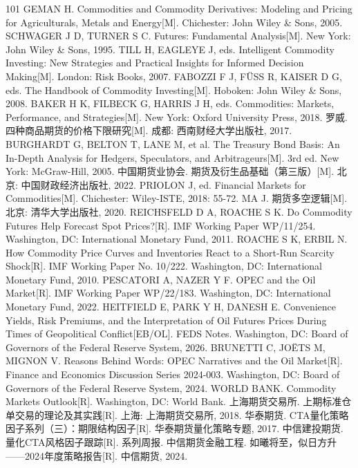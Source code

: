 \documentclass[12pt,a4paper]{ctexart}
\begin{document}
\begin{thebibliography}{101}
 GEMAN H. Commodities and Commodity Derivatives: Modeling and Pricing for Agriculturals, Metals and Energy[M]. Chichester: John Wiley \& Sons, 2005.
 SCHWAGER J D, TURNER S C. Futures: Fundamental Analysis[M]. New York: John Wiley \& Sons, 1995.
 TILL H, EAGLEYE J, eds. Intelligent Commodity Investing: New Strategies and Practical Insights for Informed Decision Making[M]. London: Risk Books, 2007.
 FABOZZI F J, FÜSS R, KAISER D G, eds. The Handbook of Commodity Investing[M]. Hoboken: John Wiley \& Sons, 2008.
 BAKER H K, FILBECK G, HARRIS J H, eds. Commodities: Markets, Performance, and Strategies[M]. New York: Oxford University Press, 2018.
 罗威. 四种商品期货的价格下限研究[M]. 成都: 西南财经大学出版社, 2017.
 BURGHARDT G, BELTON T, LANE M, et al. The Treasury Bond Basis: An In-Depth Analysis for Hedgers, Speculators, and Arbitrageurs[M]. 3rd ed. New York: McGraw-Hill, 2005.
 中国期货业协会. 期货及衍生品基础（第三版）[M]. 北京: 中国财政经济出版社, 2022.
 PRIOLON J, ed. Financial Markets for Commodities[M]. Chichester: Wiley-ISTE, 2018: 55-72.
 MA J. 期货多空逻辑[M]. 北京: 清华大学出版社, 2020.
 REICHSFELD D A, ROACHE S K. Do Commodity Futures Help Forecast Spot Prices?[R]. IMF Working Paper WP/11/254. Washington, DC: International Monetary Fund, 2011.
 ROACHE S K, ERBIL N. How Commodity Price Curves and Inventories React to a Short-Run Scarcity Shock[R]. IMF Working Paper No. 10/222. Washington, DC: International Monetary Fund, 2010.
 PESCATORI A, NAZER Y F. OPEC and the Oil Market[R]. IMF Working Paper WP/22/183. Washington, DC: International Monetary Fund, 2022.
 HEITFIELD E, PARK Y H, DANESH E. Convenience Yields, Risk Premiums, and the Interpretation of Oil Futures Prices During Times of Geopolitical Conflict[EB/OL]. FEDS Notes. Washington, DC: Board of Governors of the Federal Reserve System, 2026.
 BRUNETTI C, JOËTS M, MIGNON V. Reasons Behind Words: OPEC Narratives and the Oil Market[R]. Finance and Economics Discussion Series 2024-003. Washington, DC: Board of Governors of the Federal Reserve System, 2024.
 WORLD BANK. Commodity Markets Outlook[R]. Washington, DC: World Bank.
 上海期货交易所. 上期标准仓单交易的理论及其实践[R]. 上海: 上海期货交易所, 2018.
 华泰期货. CTA量化策略因子系列（三）：期限结构因子[R]. 华泰期货量化策略专题, 2017.
 中信建投期货. 量化CTA风格因子跟踪[R]. 系列周报.
 中信期货金融工程. 如曦将至，似日方升——2024年度策略报告[R]. 中信期货, 2024.

\end{thebibliography}
\end{document}
